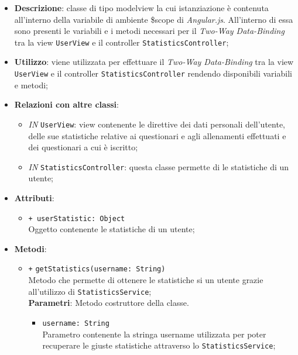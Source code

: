 \begin{itemize}
	\item \textbf{Descrizione}: classe di tipo modelview la cui istanziazione è contenuta all'interno della variabile di ambiente \$scope di \textit{Angular.js}. All'interno di essa sono presenti le variabili e i metodi necessari per il \textit{Two-Way Data-Binding} tra la view \texttt{UserView} e il controller \texttt{StatisticsController};
	\item \textbf{Utilizzo}: viene utilizzata per effettuare il \textit{Two-Way Data-Binding} tra la view \texttt{UserView} e il controller \texttt{StatisticsController} rendendo disponibili variabili e metodi;
	\item \textbf{Relazioni con altre classi}: 
	\begin{itemize}
		\item \textit{IN} \texttt{UserView}: view contenente le direttive dei dati personali dell'utente, delle sue statistiche relative ai questionari e agli allenamenti effettuati e dei questionari a cui è iscritto; 
		\item \textit{IN} \texttt{StatisticsController}: questa classe permette di le statistiche di un utente;
	\end{itemize}
	\item \textbf{Attributi}: 
	\begin{itemize}
		\item \texttt{+ userStatistic: Object} \\ Oggetto contenente le statistiche di un utente;
	\end{itemize}
	\item \textbf{Metodi}: 
	\begin{itemize}
		\item \texttt{+} \texttt{getStatistics(username: String)} \\ 
		Metodo che permette di ottenere le statistiche si un utente grazie all'utilizzo di \texttt{StatisticsService}; \\
		\textbf{Parametri}: 
		Metodo costruttore della classe. \\
		\begin{itemize}
			\item \texttt{username: String} \\
			Parametro contenente la stringa username utilizzata per poter recuperare le giuste statistiche attraverso lo \texttt{StatisticsService}; 
		\end{itemize}
	\end{itemize}
\end{itemize}	

